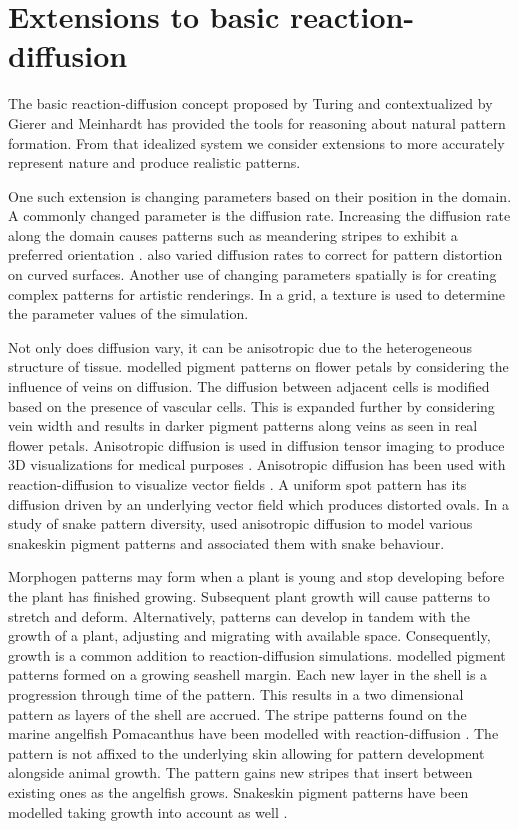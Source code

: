 \section{Extensions to basic reaction-diffusion}
The basic reaction-diffusion concept proposed by Turing and contextualized by Gierer and Meinhardt has provided the tools for reasoning about natural pattern formation. From that idealized system we consider extensions to more accurately represent nature and produce realistic patterns.


One such extension is changing parameters based on their position in the domain. A commonly changed parameter is the diffusion rate. Increasing the diffusion rate along the domain causes patterns such as meandering stripes to exhibit a preferred orientation \citep{zheng2009}. \citet{witkin1991} also varied diffusion rates to correct for pattern distortion on curved surfaces. Another use of changing parameters spatially is for creating complex patterns for artistic renderings. In a grid, a texture is used to determine the parameter values of the simulation. 

Not only does diffusion vary, it can be anisotropic due to the heterogeneous structure of tissue. \citet{zhou2007} modelled pigment patterns on flower petals by considering the influence of veins on diffusion. The diffusion between adjacent cells is modified based on the presence of vascular cells. This is expanded further by considering vein width and results in darker pigment patterns along veins as seen in real flower petals. Anisotropic diffusion is used in diffusion tensor imaging to produce 3D visualizations for medical purposes \citep{bihan2001}. Anisotropic diffusion has been used with reaction-diffusion to visualize vector fields \citep{sanderson2004}. A uniform spot pattern has its diffusion driven by an underlying vector field which produces distorted ovals. In a study of snake pattern diversity, \citet{allen2013} used anisotropic diffusion to model various snakeskin pigment patterns and associated them with snake behaviour.

Morphogen patterns may form when a plant is young and stop developing before the plant has finished growing. Subsequent plant growth will cause patterns to stretch and deform. Alternatively, patterns can develop in tandem with the growth of a plant, adjusting and migrating with available space. Consequently, growth is a common addition to reaction-diffusion simulations. \citet{fowler1992} modelled pigment patterns formed on a growing seashell margin. Each new layer in the shell is a progression through time of the pattern. This results in a two dimensional pattern as layers of the shell are accrued. The stripe patterns found on the marine angelfish Pomacanthus have been modelled with reaction-diffusion \citep{kondo1995}. The pattern is not affixed to the underlying skin allowing for pattern development alongside animal growth. The pattern gains new stripes that insert between existing ones as the angelfish grows. Snakeskin pigment patterns have been modelled taking growth into account as well \citep{murray1991}.

